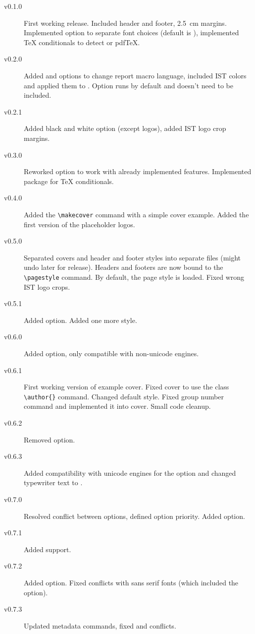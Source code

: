 \documentclass[palatino,english]{ist-report}
\begin{document}
\begin{description}
	\item [v0.1.0] First working release. Included header and footer, \SI{2.5}{\centi\meter} margins. Implemented  option to separate font choices (default is ), implemented \TeX{} conditionals to detect \XeTeX{} or pdf\TeX{}.
	\item [v0.2.0] Added  and  options to change report macro language, included IST colors and applied them to . Option  runs by default and doesn't need to be included.
	\item [v0.2.1] Added black and white option (except logos), added IST logo crop margins.
	\item [v0.3.0] Reworked  option to work with already implemented features. Implemented  package for \TeX{} conditionals.
	\item [v0.4.0] Added the \verb|\makecover| command with a simple cover example. Added the first version of the placeholder logos.
	\item [v0.5.0] Separated covers and header and footer styles into separate files (might undo later for release). Headers and footers are now bound to the \verb|\pagestyle| command. By default, the  page style is loaded. Fixed wrong IST logo crops.
	\item [v0.5.1] Added  option. Added one more style.
	\item [v0.6.0] Added  option, only compatible with non-unicode engines.
	\item [v0.6.1] First working version of example cover. Fixed cover to use the  class \verb|\author{}| command. Changed default style. Fixed group number command and implemented it into cover. Small code cleanup.
	\item [v0.6.2] Removed  option.
	\item [v0.6.3] Added compatibility with unicode engines for the  option and changed typewriter text to .
	\item [v0.7.0] Resolved conflict between options, defined option priority. Added  option.
	\item [v0.7.1] Added \LuaLaTeX{} support.
	\item [v0.7.2] Added  option. Fixed conflicts with sans serif fonts (which included the  option).
	\item [v0.7.3] Updated metadata commands, fixed  and  conflicts.
\end{description}

\printbibliography
\end{document}
